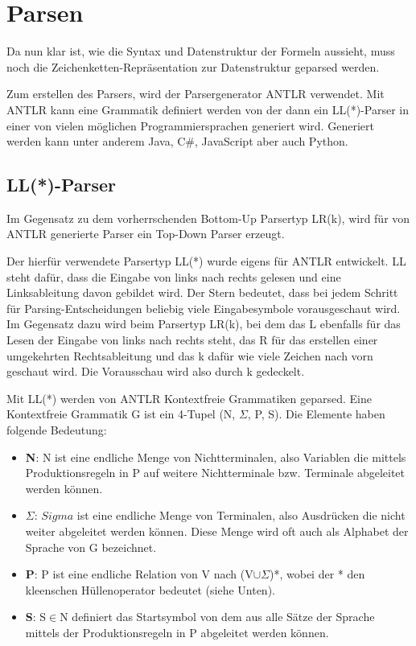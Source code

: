 \section{Parsen}
Da nun klar ist, wie die Syntax und Datenstruktur der Formeln aussieht, muss noch die Zeichenketten-Repräsentation zur Datenstruktur geparsed werden.

Zum erstellen des Parsers, wird der Parsergenerator ANTLR verwendet. Mit ANTLR kann eine Grammatik definiert werden von der dann ein LL(*)-Parser in einer von vielen möglichen Programmiersprachen generiert wird. Generiert werden kann unter anderem Java, C\#, JavaScript aber auch Python. \cite{antlr_doc}

\subsection{LL(*)-Parser}
Im Gegensatz zu dem vorherrschenden Bottom-Up Parsertyp LR(k), wird für von ANTLR generierte Parser ein Top-Down Parser erzeugt. \cite{compiler_dragon_book}\cite{ll_star_parser}

Der hierfür verwendete Parsertyp LL(*) wurde eigens für ANTLR entwickelt. LL steht dafür, dass die Eingabe von links nach rechts gelesen und eine Linksableitung davon gebildet wird. Der Stern bedeutet, dass bei jedem Schritt für Parsing-Entscheidungen beliebig viele Eingabesymbole vorausgeschaut wird. \cite{ll_star_parser} Im Gegensatz dazu wird beim Parsertyp LR(k), bei dem das L ebenfalls für das Lesen der Eingabe von links nach rechts steht, das R für das erstellen einer umgekehrten Rechtsableitung und das k dafür wie viele Zeichen nach vorn geschaut wird. Die Vorausschau wird also durch k gedeckelt. \cite{compiler_dragon_book}

Mit LL(*) werden von ANTLR Kontextfreie Grammatiken geparsed. Eine Kontextfreie Grammatik G ist ein 4-Tupel (N, $\Sigma$, P, S). Die Elemente haben folgende Bedeutung:
\begin{itemize}
\item \textbf{N}: N ist eine endliche Menge von Nichtterminalen, also Variablen die mittels Produktionsregeln in P auf weitere Nichtterminale bzw. Terminale abgeleitet werden können.

\item \textbf{$\Sigma$}: $Sigma$ ist eine endliche Menge von Terminalen, also Ausdrücken die nicht weiter abgeleitet werden können. Diese Menge wird oft auch als Alphabet der Sprache von G bezeichnet.

\item \textbf{P}: P ist eine endliche Relation von V nach (V$\cup\Sigma$)*, wobei der * den kleenschen Hüllenoperator bedeutet (siehe Unten).

\item \textbf{S}: S$\in$N definiert das Startsymbol von dem aus alle Sätze der Sprache mittels der Produktionsregeln in P abgeleitet werden können.
\end{itemize}

